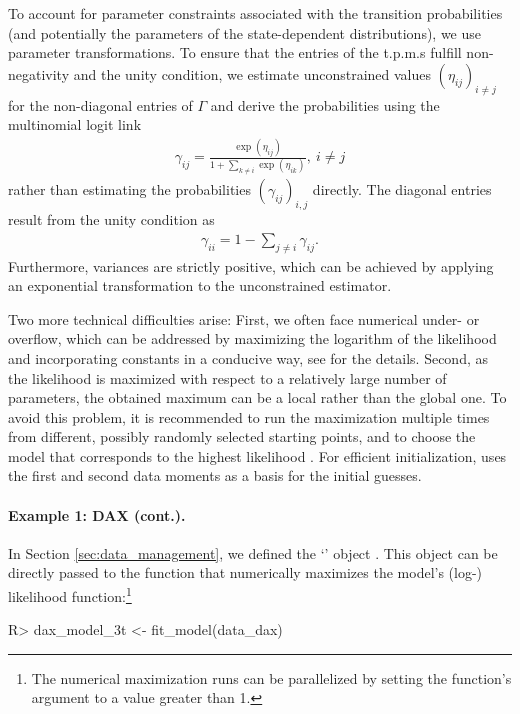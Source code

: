 \documentclass[article]{jss}
\newcommand{\class}[1]{`\code{#1}'}
\newcommand{\fct}[1]{\code{#1()}}
\begin{document}
To account for parameter constraints associated with the transition probabilities (and potentially the parameters of the state-dependent distributions), we use parameter transformations. To ensure that the entries of the t.p.m.s fulfill non-negativity and the unity condition, we estimate unconstrained values $(\eta_{ij})_{i\neq j}$ for the non-diagonal entries of $\Gamma$ and derive the probabilities using the multinomial logit link
\begin{align*}
\gamma_{ij}=\frac{\exp(\eta_{ij})}{1+\sum_{k\neq i}\exp(\eta_{ik})},~i\neq j
\end{align*}
rather than estimating the probabilities $(\gamma_{ij})_{i,j}$ directly. The diagonal entries result from the unity condition as
\begin{align*}
\gamma_{ii}=1-\sum_{j\neq i}\gamma_{ij}.
\end{align*}
Furthermore, variances are strictly positive, which can be achieved by applying an exponential transformation to the unconstrained estimator.

Two more technical difficulties arise: First, we often face numerical under- or overflow, which can be addressed by maximizing the logarithm of the likelihood and incorporating constants in a conducive way, see \cite{oel21} for the details. Second, as the likelihood is maximized with respect to a relatively large number of parameters, the obtained maximum can be a local rather than the global one. To avoid this problem, it is recommended to run the maximization multiple times from different, possibly randomly selected starting points, and to choose the model that corresponds to the highest likelihood \citep{zuc16}. For efficient initialization,  uses the first and second data moments as a basis for the initial guesses.

\paragraph{Example 1: DAX (cont.).} In Section \ref{sec:data_management}, we defined the \class{fHMM\_data} object . This object can be directly passed to the \fct{fit\_model} function that numerically maximizes the model's (log-) likelihood function:\footnote{The numerical maximization runs can be parallelized by setting the function's  argument to a value greater than 1.}

%
\begin{Schunk}
\begin{Sinput}
R> dax_model_3t <- fit_model(data_dax)
\end{Sinput}
\end{Schunk}
%
\end{document}
